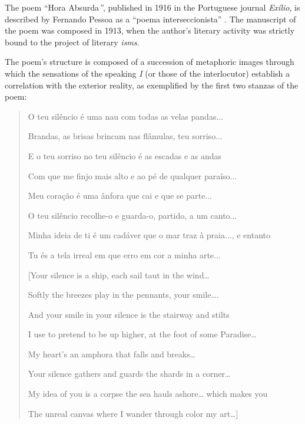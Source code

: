 \documentclass{article}
\begin{document}
The poem ``Hora Absurda\emph{''}, published in 1916 in the Portuguese
journal \emph{Exílio}, is described by Fernando Pessoa as a ``poema
interseccionista'' \citep[116]{pessoa_sensacionismo_2009}. The manuscript of the poem was
composed in 1913, when the author's literary activity was strictly bound
to the project of literary \emph{isms}.

The poem's structure is composed of a succession of metaphoric images
through which the sensations of the speaking \emph{I} (or those of the
interlocutor) establish a correlation with the exterior reality, as
exemplified by the first two stanzas of the poem:

\begin{quote}
\begin{minipage}{.9\textwidth}
O teu silêncio é uma nau com todas as velas pandas...

Brandas, as brisas brincam nas flâmulas, teu sorriso...

E o teu sorriso no teu silêncio é as escadas e as andas

Com que me finjo mais alto e ao pé de qualquer paraíso...

Meu coração é uma ânfora que cai e que se parte...

O teu silêncio recolhe-o e guarda-o, partido, a um canto...

Minha ideia de ti é um cadáver que o mar traz à praia..., e entanto

Tu és a tela irreal em que erro em cor a minha arte...
\end{minipage}

\vspace{1em}

\begin{minipage}{.9\textwidth}    
[Your silence is a ship, each sail taut in the wind\ldots{}

Softly the breezes play in the pennants, your smile\ldots.

And your smile in your silence is the stairway and stilts

I use to pretend to be up higher, at the foot of some Paradise\ldots{}

My heart's an amphora that falls and breaks\ldots{}

Your silence gathers and guards the shards in a corner\ldots{}

My idea of you is a corpse the sea hauls ashore\ldots{} which makes you

The unreal canvas where I wander through color my art\ldots{}]

\begin{flushright}
    \parencite[134]{pessoa_poems_1986}
\end{flushright}
\end{minipage}
\end{quote}
\end{document}
